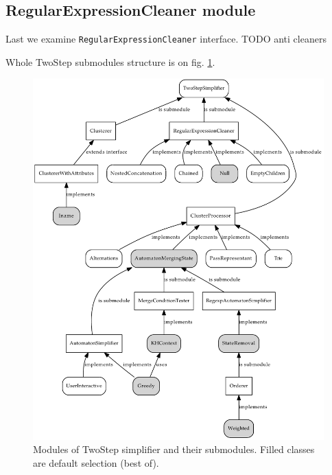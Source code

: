 \documentclass[a4paper,10pt,oneside]{article}
\newcommand{\myscale}{0.74}
\newcommand{\code}[1]{\texttt{#1}}
\begin{document}
\subsection{RegularExpressionCleaner module}
Last we examine \code{RegularExpressionCleaner} interface.
TODO anti cleaners

Whole TwoStep submodules structure is on fig. \ref{twostep_modules_complete}.
\begin{figure}
	\centering\includegraphics[scale=\myscale]{twostep_modules_complete}
	\caption{Modules of TwoStep simplifier and their submodules. Filled classes are default selection (best of).} \label{twostep_modules_complete}
\end{figure}

\nocite{*}


\end{document}

